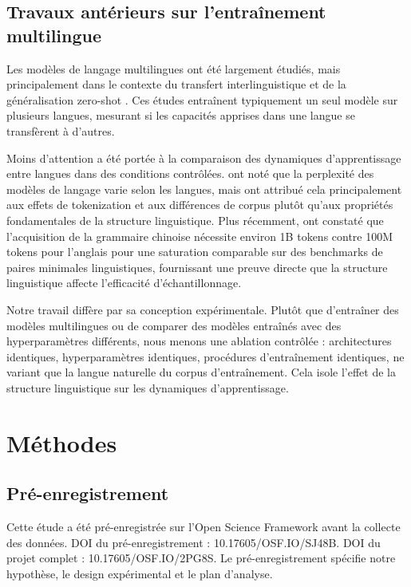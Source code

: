 \documentclass[11pt,a4paper]{article}
\begin{document}
\subsection{Travaux antérieurs sur l'entraînement multilingue}

Les modèles de langage multilingues ont été largement étudiés, mais principalement dans le contexte du transfert interlinguistique et de la généralisation zero-shot \citep{conneau2020unsupervised, xue2021mt5}. Ces études entraînent typiquement un seul modèle sur plusieurs langues, mesurant si les capacités apprises dans une langue se transfèrent à d'autres.

Moins d'attention a été portée à la comparaison des dynamiques d'apprentissage entre langues dans des conditions contrôlées. \citet{gerz2018relation} ont noté que la perplexité des modèles de langage varie selon les langues, mais ont attribué cela principalement aux effets de tokenization et aux différences de corpus plutôt qu'aux propriétés fondamentales de la structure linguistique. Plus récemment, \citet{liu2024zhoblimp} ont constaté que l'acquisition de la grammaire chinoise nécessite environ 1B tokens contre 100M tokens pour l'anglais pour une saturation comparable sur des benchmarks de paires minimales linguistiques, fournissant une preuve directe que la structure linguistique affecte l'efficacité d'échantillonnage.

Notre travail diffère par sa conception expérimentale. Plutôt que d'entraîner des modèles multilingues ou de comparer des modèles entraînés avec des hyperparamètres différents, nous menons une ablation contrôlée : architectures identiques, hyperparamètres identiques, procédures d'entraînement identiques, ne variant que la langue naturelle du corpus d'entraînement. Cela isole l'effet de la structure linguistique sur les dynamiques d'apprentissage.

\section{Méthodes}

\subsection{Pré-enregistrement}

Cette étude a été pré-enregistrée sur l'Open Science Framework avant la collecte des données. DOI du pré-enregistrement : 10.17605/OSF.IO/SJ48B. DOI du projet complet : 10.17605/OSF.IO/2PG8S. Le pré-enregistrement spécifie notre hypothèse, le design expérimental et le plan d'analyse.
\end{document}
